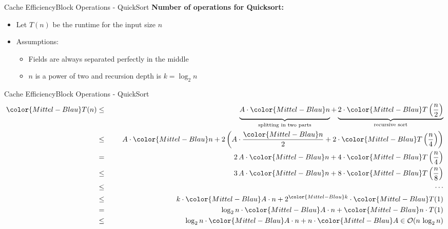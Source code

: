 
\begin{frame}{Cache Efficiency}{Block Operations - QuickSort}
  \textbf{Number of operations for Quicksort:}
   \vspace{1em}
  \begin{itemize}
  \item<2->Let {\color{Mittel-Blau}$T(n)$} be the runtime for the
    {\color{Mittel-Blau}input size $n$}
     \vspace{1em}
  \item<3->Assumptions:
     \vspace{1em}
    \begin{itemize}
    \item<4->
      Fields are always separated perfectly in the middle
      \vspace{1em}
    \item<5->
      {\color{Mittel-Blau}$n$} is a power of two and recursion depth is {\color{Mittel-Blau}$k = \log_2 n$}
    \end{itemize}
  \end{itemize}
\end{frame}


\begin{frame}{Cache Efficiency}{Block Operations - QuickSort}
  {\color{Mittel-Blau}
  \begin{eqnarray*}
    {\color{Mittel-Blau}T(n)} &\leq\hspace{1.5em}&
      \underbrace{
        A \cdot {\color{Mittel-Blau}n}
        \vphantom{\frac{n}{2}}
      }_{\text{splitting in two parts}}
      +
      \underbrace{
        2 \cdot {\color{Mittel-Blau}T\left(\frac{n}{2}\right)}
      }_{\text{recursive sort}}\\
    {} &\leq&
      A \cdot {\color{Mittel-Blau}n} + 2 \left(
        A \cdot \frac{\color{Mittel-Blau}n}{2}
        + 2 \cdot {\color{Mittel-Blau}T\left(\frac{n}{4}\right)}
      \right)\\
    {} &=&
      2\,A \cdot {\color{Mittel-Blau}n}
      + 4 \cdot {\color{Mittel-Blau}T\left(\frac{n}{4}\right)}\\
    {} &\leq&
      3\,A \cdot {\color{Mittel-Blau}n}
      + 8 \cdot {\color{Mittel-Blau}T\left(\frac{n}{8}\right)}\\
    {} &\leq&\hspace{1.5em}\cdots\\
    {} &\leq&
      k \cdot {\color{Mittel-Blau}A \cdot n}
      + 2^{\color{Mittel-Blau}k}
      \cdot {\color{Mittel-Blau}T(1)}\\
    {} &=&
      \log_2 n \cdot {\color{Mittel-Blau}A \cdot n}
      + {\color{Mittel-Blau}n \cdot T(1)}\\
    {} &\leq&
      \log_2 n \cdot {\color{Mittel-Blau}A \cdot n}
      + n \cdot {\color{Mittel-Blau}A}
      \in \mathcal{O}(n \, \log_2 n)
  \end{eqnarray*}}
\end{frame}

